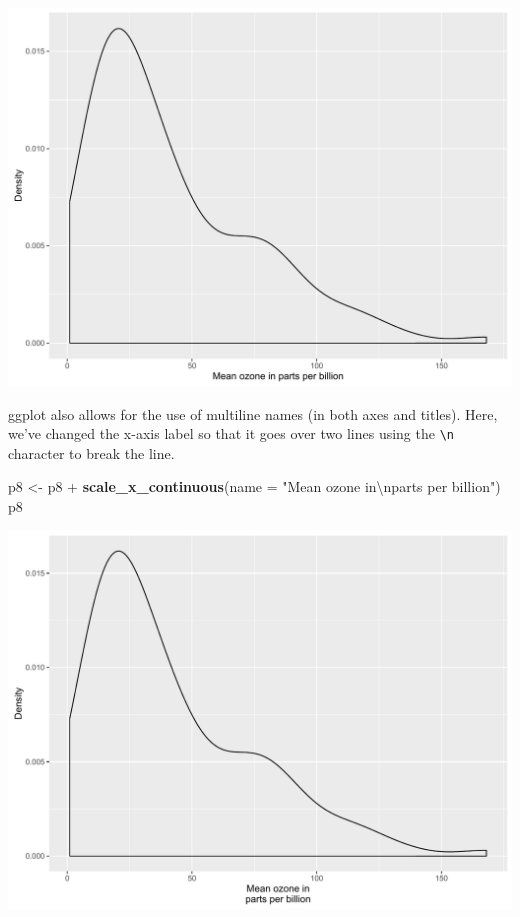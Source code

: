 \documentclass[]{article}
\newenvironment{Shaded}{\begin{snugshade}}{\end{snugshade}}
\newcommand{\KeywordTok}[1]{\textcolor[rgb]{0.13,0.29,0.53}{\textbf{{#1}}}}
\newcommand{\DataTypeTok}[1]{\textcolor[rgb]{0.13,0.29,0.53}{{#1}}}
\newcommand{\CharTok}[1]{\textcolor[rgb]{0.31,0.60,0.02}{{#1}}}
\newcommand{\StringTok}[1]{\textcolor[rgb]{0.31,0.60,0.02}{{#1}}}
\newcommand{\NormalTok}[1]{{#1}}
\begin{document}
\begin{center}\includegraphics{0_all_posts_pdf/density_2-1} \end{center}

ggplot also allows for the use of multiline names (in both axes and
titles). Here, we've changed the x-axis label so that it goes over two
lines using the \texttt{\textbackslash{}n} character to break the line.

\begin{Shaded}
\begin{Highlighting}[]
\NormalTok{p8 <-}\StringTok{ }\NormalTok{p8 +}\StringTok{ }\KeywordTok{scale_x_continuous}\NormalTok{(}\DataTypeTok{name =} \StringTok{"Mean ozone in}\CharTok{\textbackslash{}n}\StringTok{parts per billion"}\NormalTok{)}
\NormalTok{p8}
\end{Highlighting}
\end{Shaded}

\begin{center}\includegraphics{0_all_posts_pdf/density_3-1} \end{center}
\end{document}
